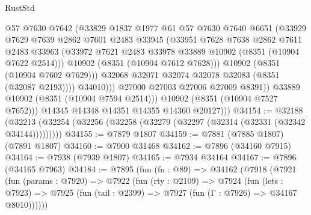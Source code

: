 \begin{lexlean}{RustStd}
\begin{coremodule}
                          @57
                          @7630
                          @7642
                          (@33829
                            @1837
                            @1977
                            @61
                            @57
                            @7630
                            @7640
                            @6651
                            (@33929
                              @7629
                              @7639
                              @2862
                              @7601
                              @2483
                              @33945
                              (@33951
                                @7628
                                @7638
                                @2862
                                @7611
                                @2483
                                @33963
                                (@33972
                                  @7621
                                  @2483
                                  @33978
                                  @33889
                                  @10902
                                  (@8351 (@10904 @7622 @2514)))
                                @10902
                                (@8351 (@10904 @7612 @7628)))
                              @10902
                              (@8351 (@10904 @7602 @7629)))
                            @32068
                            @32071
                            @32074
                            @32078
                            @32083
                            (@8351 (@32087 @2193))))
                        @34010)))
                  @27000
                  @27003
                  @27006
                  @27009
                  @8391))
              @33889
              @10902
              (@8351 (@10904 @7594 @2514)))
            @10902
            (@8351 (@10904 @7527 @7652)))
          @14345
          @14348
          @14351
          @14355
          @14360
          @20127)))
@34154 := @32188
    (@32213 (@32254 (@32256 (@32258 (@32279 (@32297 (@32314 (@32331 (@32342 @34144)))))))))
@34155 := @7879 @1807
@34159 := @7881 (@7885 @1807) (@7891 @1807)
@34160 := @7900 @31468
@34162 := @7896 (@34160 @7915)
@34164 := @7938 (@7939 @1807)
@34165 := @7934 @34164
@34167 := @7896 (@34165 @7963)
@34184 := @7895
    (fun (fn : @89) =>
    @34162
      (@7918
        (@7921
          (fun (params : @7920) =>
          @7922
            (fun (rty : @2109) =>
            @7924
              (fun (lets : @7923) =>
              @7925 (fun (tail : @2399) => @7927 (fun (Γ : @7926) => @34167 @8010))))))

\end{coremodule}
\end{lexlean}
